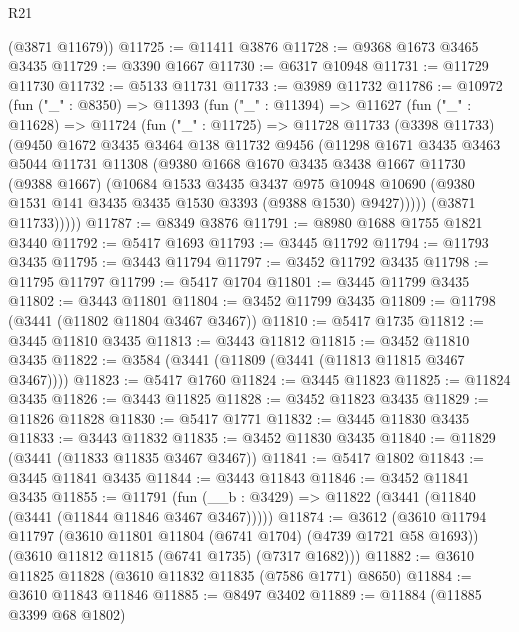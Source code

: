 \begin{lexlean}{R21}
\begin{coremodule}
      (@3871 @11679))
@11725 := @11411 @3876
@11728 := @9368 @1673 @3465 @3435
@11729 := @3390 @1667
@11730 := @6317 @10948
@11731 := @11729 @11730
@11732 := @5133 @11731
@11733 := @3989 @11732
@11786 := @10972
    (fun ("_" : @8350) =>
    @11393
      (fun ("_" : @11394) =>
      @11627
        (fun ("_" : @11628) =>
        @11724
          (fun ("_" : @11725) =>
          @11728
            @11733
            (@3398 @11733)
            (@9450
              @1672
              @3435
              @3464
              @138
              @11732
              @9456
              (@11298
                @1671
                @3435
                @3463
                @5044
                @11731
                @11308
                (@9380
                  @1668
                  @1670
                  @3435
                  @3438
                  @1667
                  @11730
                  (@9388 @1667)
                  (@10684
                    @1533
                    @3435
                    @3437
                    @975
                    @10948
                    @10690
                    (@9380 @1531 @141 @3435 @3435 @1530 @3393 (@9388 @1530) @9427)))))
            (@3871 @11733)))))
@11787 := @8349 @3876
@11791 := @8980 @1688 @1755 @1821 @3440
@11792 := @5417 @1693
@11793 := @3445 @11792
@11794 := @11793 @3435
@11795 := @3443 @11794
@11797 := @3452 @11792 @3435
@11798 := @11795 @11797
@11799 := @5417 @1704
@11801 := @3445 @11799 @3435
@11802 := @3443 @11801
@11804 := @3452 @11799 @3435
@11809 := @11798 (@3441 (@11802 @11804 @3467 @3467))
@11810 := @5417 @1735
@11812 := @3445 @11810 @3435
@11813 := @3443 @11812
@11815 := @3452 @11810 @3435
@11822 := @3584 (@3441 (@11809 (@3441 (@11813 @11815 @3467 @3467))))
@11823 := @5417 @1760
@11824 := @3445 @11823
@11825 := @11824 @3435
@11826 := @3443 @11825
@11828 := @3452 @11823 @3435
@11829 := @11826 @11828
@11830 := @5417 @1771
@11832 := @3445 @11830 @3435
@11833 := @3443 @11832
@11835 := @3452 @11830 @3435
@11840 := @11829 (@3441 (@11833 @11835 @3467 @3467))
@11841 := @5417 @1802
@11843 := @3445 @11841 @3435
@11844 := @3443 @11843
@11846 := @3452 @11841 @3435
@11855 := @11791 (fun (__b : @3429) => @11822 (@3441 (@11840 (@3441 (@11844 @11846 @3467 @3467)))))
@11874 := @3612
    (@3610
      @11794
      @11797
      (@3610 @11801 @11804 (@6741 @1704) (@4739 @1721 @58 @1693))
      (@3610 @11812 @11815 (@6741 @1735) (@7317 @1682)))
@11882 := @3610 @11825 @11828 (@3610 @11832 @11835 (@7586 @1771) @8650)
@11884 := @3610 @11843 @11846
@11885 := @8497 @3402
@11889 := @11884 (@11885 @3399 @68 @1802)

\end{coremodule}
\end{lexlean}
